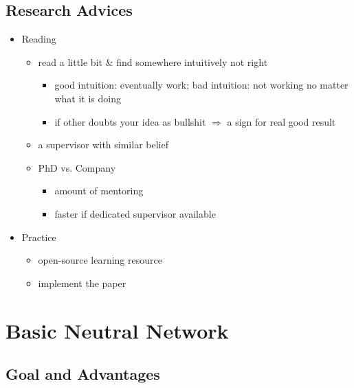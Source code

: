 \subsection{Research Advices}
\begin{itemize}
	\item Reading
	\begin{itemize}
		\item read a little bit \& find somewhere intuitively not right
		\begin{itemize}
			\item good intuition: eventually work; bad intuition: not working no matter what it is doing
			\item if other doubts your idea as bullshit $\Rightarrow$ a sign for real good result
		\end{itemize}
		\item a supervisor with similar belief
		\item PhD vs. Company
			\begin{itemize}
			\item amount of mentoring
			\item faster if dedicated supervisor available
			\end{itemize}
	\end{itemize}
	
	\item Practice
		\begin{itemize}
		\item open-source learning resource
		\item implement the paper
		\end{itemize}
\end{itemize}


\section{Basic Neutral Network}

\subsection{Goal and Advantages}
